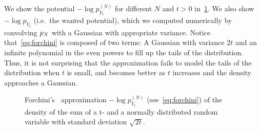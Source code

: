 We show the potential \( -\log p_{Y_t}^{(N)} \) for different \( N \) and \( t > \num{0} \) in~\cref{fig:forchini}.
We also show \( -\log p_{Y_t} \) (i.e.\ the wanted potential), which we computed numerically by convolving \( p_X \) with a Gaussian with appropriate variance.
Notice that~\eqref{eq:forchini} is composed of two terms:
A Gaussian with variance \( \num{2}t \) and an infinite polynomial in the even powers to fill up the tails of the distribution.
Thus, it is not surprising that the approximation fails to model the tails of the distribution when \( t \) is small, and becomes better as \( t \) increases and the density approaches a Gaussian.
\begin{figure}
	\caption[Forchini's approximation of the density of the sum of a t- and a normally distributed random variable]{%
		Forchini's~\cite{forchini_distribution_2008} approximation \( -\log p_{Y_t}^{(N)} \) (see~\eqref{eq:forchini}) of the density of the sum of a t- and a normally distributed random variable with standard deviation \( \sqrt{\num{2}t} \).
	}%
	\label{fig:forchini}
\end{figure}

